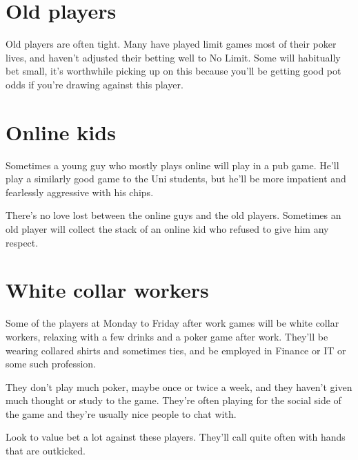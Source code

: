 \section{Old players}

Old players are often tight. Many have played limit games most of their
poker lives, and haven't adjusted their betting well to No Limit. Some
will habitually bet small, it's worthwhile picking up on this because
you'll be getting good pot odds if you're drawing against this player.

\section{Online kids}

Sometimes a young guy who mostly plays online will play in a pub game.
He'll play a similarly good game to the Uni students, but he'll be
more impatient and fearlessly aggressive with his chips.

There's no love lost between the online guys and the old players. Sometimes
an old player will collect the stack of an online kid who refused to
give him any respect.

\section{White collar workers}

Some of the players at Monday to Friday after work games will be white
collar workers, relaxing with a few drinks and a poker game after work.
They'll be wearing collared shirts and sometimes ties, and be employed
in Finance or IT or some such profession.

They don't play much poker, maybe once or twice a week, and they haven't
given much thought or study to the game. They're often playing for the
social side of the game and they're usually nice people to chat with.

Look to value bet a lot against these players. They'll call quite often
with hands that are outkicked.






